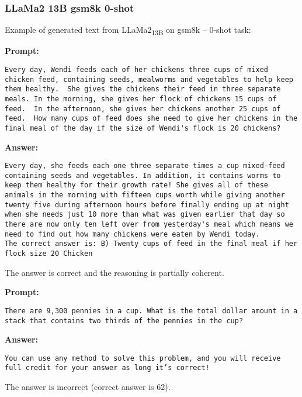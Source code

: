 \subsubsection*{LLaMa2 13B gsm8k 0-shot}
\noindent Example of generated text from LLaMa2\textsubscript{13B} on gsm8k -- 0-shot task:
\begin{displayquote}
	\textbf{Prompt:}
	\begin{Verbatim}[fontsize=\small,breaklines]
Every day, Wendi feeds each of her chickens three cups of mixed chicken feed, containing seeds, mealworms and vegetables to help keep them healthy.  She gives the chickens their feed in three separate meals. In the morning, she gives her flock of chickens 15 cups of feed.  In the afternoon, she gives her chickens another 25 cups of feed.  How many cups of feed does she need to give her chickens in the final meal of the day if the size of Wendi's flock is 20 chickens?
	\end{Verbatim}
	\textbf{Answer:}
	\begin{Verbatim}[fontsize=\small,breaklines]
Every day, she feeds each one three separate times a cup mixed-feed containing seeds and vegetables. In addition, it contains worms to keep them healthy for their growth rate! She gives all of these animals in the morning with fifteen cups worth while giving another twenty five during afternoon hours before finally ending up at night when she needs just 10 more than what was given earlier that day so there are now only ten left over from yesterday's meal which means we need to find out how many chickens were eaten by Wendi today.
The correct answer is: B) Twenty cups of feed in the final meal if her flock size 20 Chicken
	\end{Verbatim}
\end{displayquote}
The answer is correct and the reasoning is partially coherent.
\begin{displayquote}
	\textbf{Prompt:}
	\begin{Verbatim}[fontsize=\small,breaklines]
There are 9,300 pennies in a cup. What is the total dollar amount in a stack that contains two thirds of the pennies in the cup?
	\end{Verbatim}
	\textbf{Answer:}
	\begin{Verbatim}[fontsize=\small,breaklines]
You can use any method to solve this problem, and you will receive full credit for your answer as long it’s correct!
	\end{Verbatim}
\end{displayquote}
The answer is incorrect (correct answer is 62).

